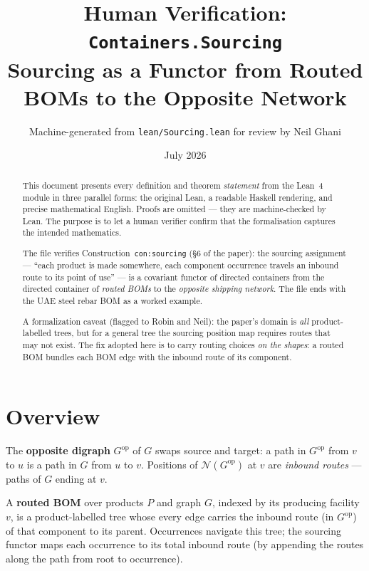 \documentclass[11pt,a4paper]{article}
\title{Human Verification: \texttt{Containers.Sourcing}\\[4pt]
  \large Sourcing as a Functor from Routed BOMs to the Opposite Network}
\author{Machine-generated from \texttt{lean/Sourcing.lean} for review by Neil Ghani}
\date{July 2026}
\begin{document}
\maketitle

\begin{abstract}
This document presents every definition and theorem \emph{statement} from the
Lean~4 module  in three parallel forms: the original
Lean, a readable Haskell rendering, and precise mathematical English.  Proofs
are omitted --- they are machine-checked by Lean.  The purpose is to let a
human verifier confirm that the formalisation captures the intended
mathematics.

The file verifies Construction~\texttt{con:sourcing} (\S6 of the paper): the
sourcing assignment --- ``each product is made somewhere, each component
occurrence travels an inbound route to its point of use'' --- is a covariant
functor of directed containers from the directed container of
\emph{routed BOMs} to the \emph{opposite shipping network}.  The file ends
with the UAE steel rebar BOM as a worked example.

A formalization caveat (flagged to Robin and Neil): the paper's domain is
\emph{all} product-labelled trees, but for a general tree the sourcing
position map requires routes that may not exist.  The fix adopted here is to
carry routing choices \emph{on the shapes}: a routed BOM bundles each BOM
edge with the inbound route of its component.
\end{abstract}

\tableofcontents
\bigskip

\section{Overview}

The \textbf{opposite digraph} $G^{\mathrm{op}}$ of $G$ swaps source and
target: a path in $G^{\mathrm{op}}$ from $v$ to $u$ is a path in $G$ from $u$
to $v$.  Positions of $\mathcal{N}(G^{\mathrm{op}})$ at $v$ are
\emph{inbound routes} --- paths of $G$ ending at $v$.

A \textbf{routed BOM} over products $P$ and graph $G$, indexed by its
producing facility $v$, is a product-labelled tree whose every edge carries
the inbound route (in $G^{\mathrm{op}}$) of that component to its parent.
Occurrences navigate this tree; the sourcing functor maps each occurrence to
its total inbound route (by appending the routes along the path from root to
occurrence).
\end{document}
